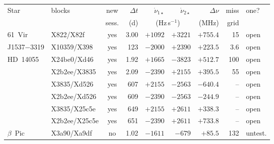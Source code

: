 \begin{tabular}{@{}l@{\,}l@{\,}c@{\,}r@{\,}r@{\,}r@{\,}r@{\,}r@{\,}l@{}}
\hline
Star & blocks & new & $\Delta t$ & $\dot\nu_{1\star}$ & $\dot\nu_{2\star}$ & $\Delta\nu$ & miss & one? \\
 & & sess. & (d) & \multicolumn{2}{c}{(Hz\,s$^{-1}$)} & (MHz) & grid & \\
\hline
61~Vir & X822/X82f & yes & 3.00 & $+1092$ & $+3221$ & $+755.4$ & 15 & open \\
J1537$-$3319 & X10359/X398 & yes & 123 & $-2000$ & $+2390$ & $+223.5$ & 3.6 & open \\
HD~14055 & X24be0/Xd46 & yes & 1.92 & $+1665$ & $-3823$ & $+512.7$ & 100 & open \\
 & X2b2ee/X3835 & yes & 2.09 & $-2390$ & $+2155$ & $+395.5$ & 55 & open \\
 & X3835/Xd526 & yes & 607 & $+2155$ & $-2563$ & $-640.4$ & -- & open \\
 & X2b2ee/Xd526 & yes & 609 & $-2390$ & $-2563$ & $-244.9$ & -- & open \\
 & X3835/X25c5e & yes & 649 & $+2155$ & $+2611$ & $+338.3$ & -- & open \\
 & X2b2ee/X25c5e & yes & 651 & $-2390$ & $+2611$ & $+733.8$ & -- & open \\
$\beta$~Pic & X3a90/Xa9df & no & 1.02 & $-1611$ & $-679$ & $+85.5$ & 132 & untest. \\
\hline
\end{tabular}
